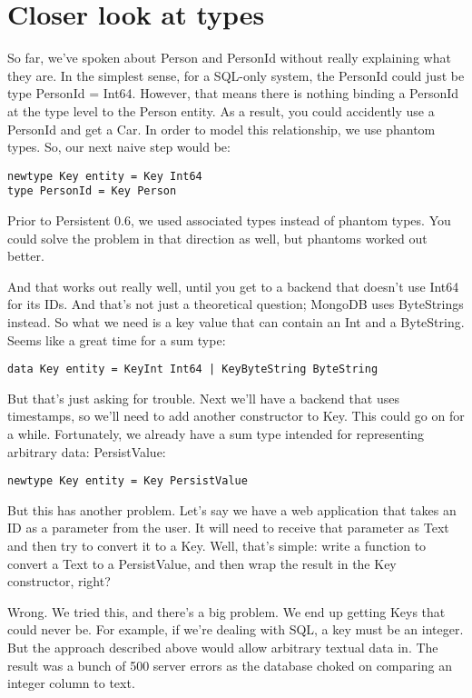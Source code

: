 \section{Closer look at types}

So far, we've spoken about Person and PersonId without really explaining what they are. In the simplest sense, for a SQL-only system, the PersonId could just be type PersonId = Int64. However, that means there is nothing binding a PersonId at the type level to the Person entity. As a result, you could accidently use a PersonId and get a Car. In order to model this relationship, we use phantom types. So, our next naive step would be:

\begin{lstlisting}
newtype Key entity = Key Int64
type PersonId = Key Person
\end{lstlisting}

Prior to Persistent 0.6, we used associated types instead of phantom types. You could solve the problem in that direction as well, but phantoms worked out better.

And that works out really well, until you get to a backend that doesn't use Int64 for its IDs. And that's not just a theoretical question; MongoDB uses ByteStrings instead. So what we need is a key value that can contain an Int and a ByteString. Seems like a great time for a sum type:

\begin{lstlisting}
data Key entity = KeyInt Int64 | KeyByteString ByteString
\end{lstlisting}

But that's just asking for trouble. Next we'll have a backend that uses timestamps, so we'll need to add another constructor to Key. This could go on for a while. Fortunately, we already have a sum type intended for representing arbitrary data: PersistValue:

\begin{lstlisting}
newtype Key entity = Key PersistValue
\end{lstlisting}

But this has another problem. Let's say we have a web application that takes an ID as a parameter from the user. It will need to receive that parameter as Text and then try to convert it to a Key. Well, that's simple: write a function to convert a Text to a PersistValue, and then wrap the result in the Key constructor, right?

Wrong. We tried this, and there's a big problem. We end up getting Keys that could never be. For example, if we're dealing with SQL, a key must be an integer. But the approach described above would allow arbitrary textual data in. The result was a bunch of 500 server errors as the database choked on comparing an integer column to text.

